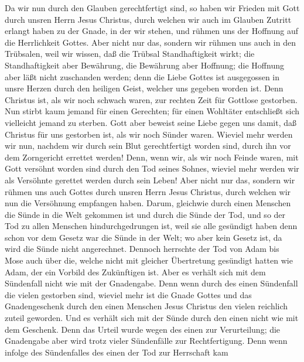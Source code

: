  Da wir nun durch den Glauben gerechtfertigt sind, so
haben wir Frieden mit Gott durch unsren Herrn Jesus Christus,
 durch welchen wir auch im Glauben Zutritt erlangt haben
zu der Gnade, in der wir stehen, und rühmen uns der Hoffnung auf die
Herrlichkeit Gottes.  Aber nicht nur das, sondern wir
rühmen uns auch in den Trübsalen, weil wir wissen, daß die Trübsal
Standhaftigkeit wirkt;  die Standhaftigkeit aber
Bewährung, die Bewährung aber Hoffnung;  die Hoffnung aber
läßt nicht zuschanden werden; denn die Liebe Gottes ist ausgegossen in
unsre Herzen durch den heiligen Geist, welcher uns gegeben worden ist.
 Denn Christus ist, als wir noch schwach waren, zur
rechten Zeit für Gottlose gestorben.  Nun stirbt kaum
jemand für einen Gerechten; für einen Wohltäter entschließt sich
vielleicht jemand zu sterben.  Gott aber beweist seine
Liebe gegen uns damit, daß Christus für uns gestorben ist, als wir noch
Sünder waren.  Wieviel mehr werden wir nun, nachdem wir
durch sein Blut gerechtfertigt worden sind, durch ihn vor dem
Zorngericht errettet werden!  Denn, wenn wir, als wir
noch Feinde waren, mit Gott versöhnt worden sind durch den Tod seines
Sohnes, wieviel mehr werden wir als Versöhnte gerettet werden durch sein
Leben!  Aber nicht nur das, sondern wir rühmen uns auch
Gottes durch unsren Herrn Jesus Christus, durch welchen wir nun die
Versöhnung empfangen haben.  Darum, gleichwie durch einen
Menschen die Sünde in die Welt gekommen ist und durch die Sünde der Tod,
und so der Tod zu allen Menschen hindurchgedrungen ist, weil sie alle
gesündigt haben  denn schon vor dem Gesetz war die Sünde
in der Welt; wo aber kein Gesetz ist, da wird die Sünde nicht
angerechnet.  Dennoch herrschte der Tod von Adam bis Mose
auch über die, welche nicht mit gleicher Übertretung gesündigt hatten
wie Adam, der ein Vorbild des Zukünftigen ist.  Aber es
verhält sich mit dem Sündenfall nicht wie mit der Gnadengabe. Denn wenn
durch des einen Sündenfall die vielen gestorben sind, wieviel mehr ist
die Gnade Gottes und das Gnadengeschenk durch den einen Menschen Jesus
Christus den vielen reichlich zuteil geworden.  Und es
verhält sich mit der Sünde durch den einen nicht wie mit dem Geschenk.
Denn das Urteil wurde wegen des einen zur Verurteilung; die Gnadengabe
aber wird trotz vieler Sündenfälle zur Rechtfertigung. 
Denn wenn infolge des Sündenfalles des einen der Tod zur Herrschaft kam
